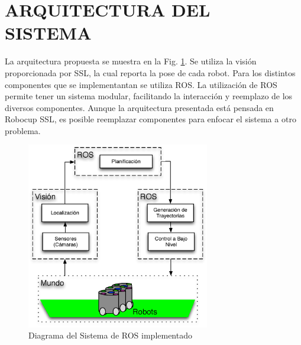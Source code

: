 \documentclass[twocolumn,10pt]{amrob}
\begin{document}
\section*{ARQUITECTURA DEL SISTEMA}
La arquitectura propuesta se muestra en la Fig. \ref{fig:ROSGral}. Se utiliza la visión proporcionada por SSL, la cual reporta la pose de cada robot. Para los distintos componentes que se implementantan se utiliza ROS. La utilización de ROS permite tener un sistema modular, facilitando la interacción y reemplazo de los diversos componentes. Aunque la arquitectura presentada está pensada en Robocup SSL, es posible reemplazar componentes para enfocar el sistema a otro problema. \par

\begin{figure}
  \centering
    \includegraphics[width=8cm]{arqGeneral.eps}
  \caption{Diagrama del Sistema de ROS implementado}
  \label{fig:ROSGral}
\end{figure}
\end{document}

